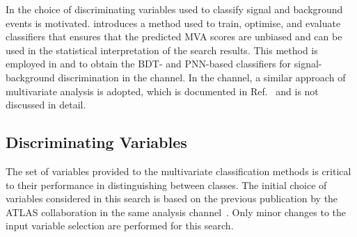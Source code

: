 In  the choice of discriminating
variables used to classify signal and background events is
motivated.  introduces a method used to train,
optimise, and evaluate classifiers that ensures that the predicted MVA scores
are unbiased and can be used in the statistical interpretation of the search
results. This method is employed in  and 
to obtain the BDT- and PNN-based classifiers for signal-background
discrimination in the \hadhad channel. In the \lephad channel, a similar
approach of multivariate analysis is adopted, which is documented in
Ref.~\cite{HDBS-2018-40} and is not discussed in detail.


\subsection{Discriminating Variables}%
\label{sec:mva_discriminating variables}

The set of variables provided to the multivariate classification methods is
critical to their performance in distinguishing between classes. The initial
choice of variables considered in this search is based on the previous
publication by the ATLAS collaboration in the same analysis
channel~\cite{HIGG-2016-16-witherratum}. Only minor changes to the input
variable selection are performed for this search.

